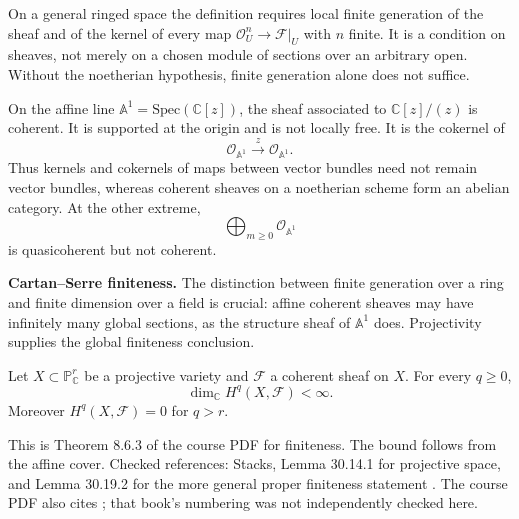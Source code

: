 On a general ringed space the definition
requires local finite generation of the
sheaf and of the kernel of every map
$\mathcal{O}_U^n\to\mathcal{F}|_U$ with
$n$ finite. It is a condition on sheaves,
not merely on a chosen module of sections
over an arbitrary open. Without the
noetherian hypothesis, finite generation
alone does not suffice.

\begin{example}
\label{example-coherence-not-local-freeness}
On the affine line
$\mathbb{A}^1=\mathrm{Spec}(\mathbb{C}[z])$,
the sheaf associated to
$\mathbb{C}[z]/(z)$ is coherent. It is
supported at the origin and is not locally
free. It is the cokernel of
$$
\mathcal{O}_{\mathbb{A}^1}
\xrightarrow{\ z\ }
\mathcal{O}_{\mathbb{A}^1}.
$$
Thus kernels and cokernels of maps between
vector bundles need not remain vector
bundles, whereas coherent sheaves on a
noetherian scheme form an abelian category.
At the other extreme,
$$
\bigoplus_{m\geq0}\mathcal{O}_{\mathbb{A}^1}
$$
is quasicoherent but not coherent.
\end{example}

\medskip\noindent
{\bf Cartan--Serre finiteness.}
The distinction between finite generation
over a ring and finite dimension over a
field is crucial: affine coherent sheaves may have
infinitely many global sections, as the
structure sheaf of $\mathbb{A}^1$ does.
Projectivity supplies the global
finiteness conclusion.

\begin{theorem}
\label{theorem-jethro-2026-11-16-finiteness}
Let $X\subset\mathbb{P}^r_{\mathbb{C}}$ be a
projective variety and $\mathcal{F}$ a
coherent sheaf on $X$. For every $q\geq0$,
$$
\dim_{\mathbb{C}}H^q(X,\mathcal{F})<\infty.
$$
Moreover $H^q(X,\mathcal{F})=0$ for $q>r$.
\end{theorem}

This is Theorem 8.6.3 of the course PDF
for finiteness. The bound follows from
the affine cover. Checked references:
Stacks, Lemma 30.14.1 for projective space,
and Lemma 30.19.2 for the more general
proper finiteness statement
\cite{stacks-project}. The course PDF
also cites \cite[Theorem III.5.1]{har};
that book's numbering was not independently
checked here.

